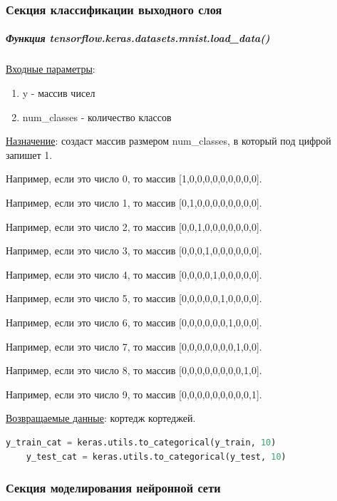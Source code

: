 \subsubsection{Секция классификации выходного слоя}

\subparagraph{Функция tensorflow.keras.datasets.mnist.load\_data()} \hspace{0pt}

\underline{Входные параметры}:

\begin{enumerate}
    \item y - массив чисел
    \item num\_classes - количество классов
\end{enumerate}

\underline{Назначение}: создаст массив размером num\_classes, в который под цифрой запишет 1.

Например, если это число 0, то массив [1,0,0,0,0,0,0,0,0,0].

Например, если это число 1, то массив [0,1,0,0,0,0,0,0,0,0].

Например, если это число 2, то массив [0,0,1,0,0,0,0,0,0,0].

Например, если это число 3, то массив [0,0,0,1,0,0,0,0,0,0].

Например, если это число 4, то массив [0,0,0,0,1,0,0,0,0,0].

Например, если это число 5, то массив [0,0,0,0,0,1,0,0,0,0].

Например, если это число 6, то массив [0,0,0,0,0,0,1,0,0,0].

Например, если это число 7, то массив [0,0,0,0,0,0,0,1,0,0].

Например, если это число 8, то массив [0,0,0,0,0,0,0,0,1,0].

Например, если это число 9, то массив [0,0,0,0,0,0,0,0,0,1].

\underline{Возвращаемые данные}: кортедж кортеджей.

\begin{lstlisting}[language=Python,]
    y_train_cat = keras.utils.to_categorical(y_train, 10)
    y_test_cat = keras.utils.to_categorical(y_test, 10)
\end{lstlisting}



\subsubsection{Секция моделирования нейронной сети}



